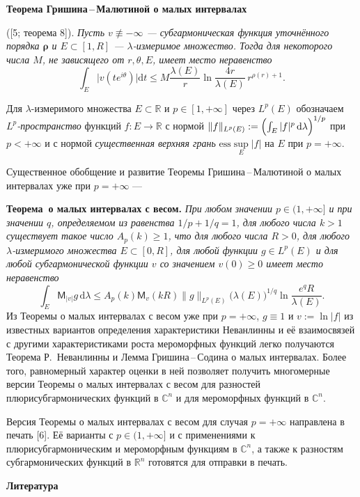  \noindent
{\bf Теорема Гришина\,--\,Малютиной о малых интервалах} {\rm ([5; теорема 8]). {\it Пусть $v\not\equiv -\infty$ --- субгармоническая функция уточнённого порядка $\mathbf{\rho}$ и $E\subset [1,R]$ --- $\lambda$-измеримое множество. Тогда для некоторого числа $M$, не зависящего от $r, \theta, E$, имеет место неравенство
$$
\int_{E} \bigl|v(te^{i\theta})\bigr| \mathrm{d} t\leq
M\frac{\lambda( E)}{r}\ln
\frac{4r}{\lambda( E)}\, r^{\rho(r)+1}.
$$
}

Для $\lambda$-измеримого множества $E\subset \mathbb R$ и $p\in [1,+\infty]$
через $L^p(E)$ обозначаем \textit{$L^p$-пространство\/} функций $f\colon E\to \mathbb R$ с нормой $\|f\|_{L^p(E)}:=\Bigl(\int_E|f|^p\,\mathrm{d}\lambda\Bigr)^{1/p}$ при $p<+\infty$ и с нормой \textit{существенная верхняя грань\/} $\mathrm{ess}\sup\limits_E |f|$ на $E$ при $p=+\infty$.

Существенное обобщение и развитие Теоремы Гришина\,--\,Малютиной о малых интервалах уже при $p=+\infty$ ---

\noindent
\textbf{Теорема~о малых интервалах с весом.} {\it При любом значении $p\in (1,+\infty]$ и при значении $q$, определяемом из равенства $1/p+1/q=1$, для любого числа $k>1$ существует такое число $A_p(k)\geq 1$, что
для любого числа $R> 0$, для любого $\lambda$-измеримого множества $E\subset [0,R]$, для любой функции $g\in L^p(E)$ и для любой субгармонической функции $v$ со значением $v(0)\geq 0$ имеет место неравенство
$$
\int_E\mathsf{M}_{|v|}g\,\mathrm{d} \lambda \leq A_p(k)\mathsf{M}_{v}(kR)
\|g\|_{L^p(E)}\bigl(\lambda(E)\bigr)^{1/q}\ln \frac{e^qR}{\lambda(E)}.
$$
}
Из Теоремы о малых интервалах с весом уже при $p=+\infty$, $g\equiv 1$ и $v:=\ln |f|$ из известных вариантов определения характеристики Неванлинны и её взаимосвязей с другими характеристиками роста мероморфных функций легко получаются Теорема Р.~Неванлинны и Лемма Гришина\,--\,Содина о малых интервалах. Более того, равномерный характер оценки в ней позволяет получить многомерные версии Теоремы о малых интервалах с весом для разностей плюрисубгармонических функций в $\mathbb C^n$ и для мероморфных функций в $\mathbb C^n$.

Версия Теоремы о малых интервалах с весом для случая $p=+\infty$ направлена
в печать [6]. Её варианты с $p\in (1,+\infty]$ и с применениями к плюрисубгармоническим и мероморфным функциям в $\mathbb C^n$, а также
к разностям субгармонических функций в $\mathbb R^n$ готовятся для отправки в печать.

\smallskip \centerline {\bf Литература} \nopagebreak

}

